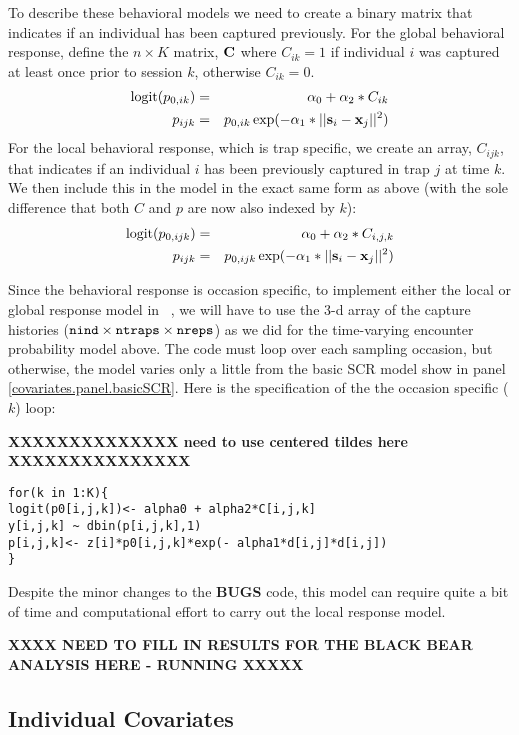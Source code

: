 To describe these behavioral models we need to create a binary matrix that indicates
if an individual has been captured previously.  For the global
behavioral response, define the $n \times K$ matrix,
${\bf C}$ where $C_{ik} =1$
if individual $i$ was captured at least once prior to session
$k$, otherwise $C_{ik} = 0$.
\begin{eqnarray*}
\mbox{logit}(p_{0,ik})& =& \alpha_{0} + \alpha_{2}*C_{ik} \\
p_{ijk} &= &p_{0,ik} \exp(- \alpha_{1}*||{\bf s}_{i}-{\bf x}_{j}||^2)
\end{eqnarray*}
For the local behavioral response, which is trap specific, we create
an array, $C_{ijk}$, that indicates if an individual $i$ has been
previously captured in trap $j$ at time $k$.  We then include this in
the model in the exact same form as above (with the sole difference that both $C$ and $p$ 
are now also indexed by $k$):
\begin{eqnarray*}
\mbox{logit}(p_{0,ijk}) &= &\alpha_{0} + \alpha_{2}*C_{i,j,k} \\
          p_{ijk} &= &  p_{0,ijk} \exp(- \alpha_{1}*||{\bf s}_{i}-{\bf x}_{j}||^2)
\end{eqnarray*}

Since the behavioral response is occasion specific, to implement either the local or global response model in \jags~, we will have to use the 3-d array of the
capture histories ($\mbox{\tt nind} \times \mbox{\tt ntraps} \times
\mbox{\tt nreps}$) as we did for the time-varying encounter probability
model above. The code must loop over each sampling occasion, but otherwise, the model
varies only a little from the basic SCR model show in panel \ref{covariates.panel.basicSCR}.  
Here is the specification of the the occasion specific ($k$) loop:

{\bf XXXXXXXXXXXXXX need to use centered tildes here XXXXXXXXXXXXXXX}
{\small
\begin{verbatim}
for(k in 1:K){
logit(p0[i,j,k])<- alpha0 + alpha2*C[i,j,k]
y[i,j,k] ~ dbin(p[i,j,k],1)
p[i,j,k]<- z[i]*p0[i,j,k]*exp(- alpha1*d[i,j]*d[i,j])
}
\end{verbatim}
}
Despite the minor changes to the {\bf BUGS} code, this model can require quite a bit of time and computational 
effort to carry out the local response model.  

{\bf XXXX NEED TO FILL IN RESULTS FOR THE BLACK BEAR ANALYSIS HERE -
  RUNNING XXXXX }


\subsection{Individual Covariates}

